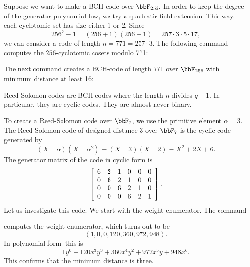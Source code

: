 \bigskip

Suppose we want to make a BCH-code over $\bbF_{256}.$
In order to keep the degree of the generator polynomial low, we try a quadratic field extension. 
This way, each cyclotomic set has size either 1 or 2.
Since 
$$
256^2-1 = (256+1)(256-1) = 257 \cdot 3 \cdot 5 \cdot 17,
$$
we can consider a code of length $n=771=257\cdot 3.$ 
The following command computes the $256$-cyclotomic cosets modulo 771:
{\tt

}
The next command creates a BCH-code of length 771 over $\bbF_{256}$ with minimum distance at least 16:
{\tt

}

\bigskip

Reed-Solomon codes are BCH-codes where the length $n$ divides $q-1.$
In particular, they are cyclic codes. They are almost never binary.

\bigskip

To create a Reed-Solomon code over $\bbF_7$, we use the primitive element $\alpha=3$.
The Reed-Solomon code of designed distance 3 over $\bbF_7$ is the cyclic code generated by 
$$
(X-\alpha)(X-\alpha^2) = (X-3)(X-2)= X^2+2X+6.
$$
The generator matrix of the code in cyclic form is
$$
\left[
\begin{array}{*{6}c}
6  & 2  & 1  & 0  & 0  & 0\\
0  & 6  & 2  & 1  & 0  & 0\\
0  & 0  & 6  & 2  & 1  & 0\\
0  & 0  & 0  & 6  & 2  & 1\\
\end{array}
\right].
$$
Let us investigate this code. We start with the weight enumerator. 
The command 
{\tt

}
{\tt

}
computes the weight enumerator, which turns out to be
$$
( 1, 0, 0, 120, 360, 972, 948 ).
$$
In polynomial form, this is
$$
1y^6 + 120x^3y^3 + 360x^4y^2 + 972x^5y + 948x^6.
$$
This confirms that the minimum distance is three.

\bigskip

